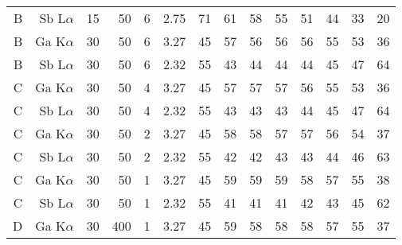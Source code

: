 \begin{table}[phtb]
\begin{center}
\begin{tabular}{rrrrrrrrrrrrrr}
            B            & Sb L$\alpha$  & 15             & 50             & 6           & 2.75              & 71             & 61           & 58            & 55             & 51             & 44             & 33            & 20             \\
            B            & Ga K$\alpha$  & 30             & 50             & 6           & 3.27              & 45             & 57           & 56            & 56             & 56             & 55             & 53            & 36             \\
            B            & Sb L$\alpha$  & 30             & 50             & 6           & 2.32              & 55             & 43           & 44            & 44             & 44             & 45             & 47            & 64             \\
            \hline
            C            & Ga K$\alpha$  & 30             & 50             & 4           & 3.27              & 45             & 57           & 57            & 57             & 56             & 55             & 53            & 36             \\
            C            & Sb L$\alpha$  & 30             & 50             & 4           & 2.32              & 55             & 43           & 43            & 43             & 44             & 45             & 47            & 64             \\
            C            & Ga K$\alpha$  & 30             & 50             & 2           & 3.27              & 45             & 58           & 58            & 57             & 57             & 56             & 54            & 37             \\
            C            & Sb L$\alpha$  & 30             & 50             & 2           & 2.32              & 55             & 42           & 42            & 43             & 43             & 44             & 46            & 63             \\
            C            & Ga K$\alpha$  & 30             & 50             & 1           & 3.27              & 45             & 59           & 59            & 59             & 58             & 57             & 55            & 38             \\
            C            & Sb L$\alpha$  & 30             & 50             & 1           & 2.32              & 55             & 41           & 41            & 41             & 42             & 43             & 45            & 62             \\
            \hline
            D            & Ga K$\alpha$  & 30             & 400            & 1           & 3.27              & 45             & 59           & 58            & 58             & 58             & 57             & 55            & 37             \\

\end{tabular}
\end{center}
\end{table}
